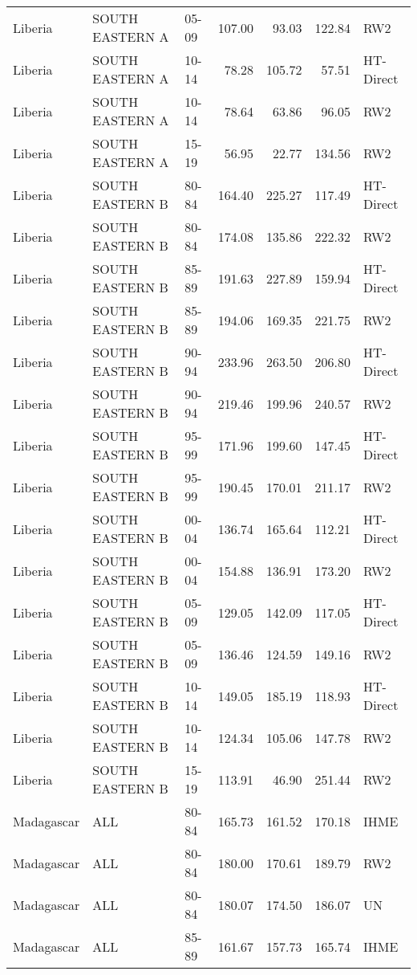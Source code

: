\begin{longtable}{lllrrrl}
  Liberia & SOUTH EASTERN A & 05-09 & 107.00 & 93.03 & 122.84 & RW2 \\ 
  Liberia & SOUTH EASTERN A & 10-14 & 78.28 & 105.72 & 57.51 & HT-Direct \\ 
  Liberia & SOUTH EASTERN A & 10-14 & 78.64 & 63.86 & 96.05 & RW2 \\ 
  Liberia & SOUTH EASTERN A & 15-19 & 56.95 & 22.77 & 134.56 & RW2 \\ 
  Liberia & SOUTH EASTERN B & 80-84 & 164.40 & 225.27 & 117.49 & HT-Direct \\ 
  Liberia & SOUTH EASTERN B & 80-84 & 174.08 & 135.86 & 222.32 & RW2 \\ 
  Liberia & SOUTH EASTERN B & 85-89 & 191.63 & 227.89 & 159.94 & HT-Direct \\ 
  Liberia & SOUTH EASTERN B & 85-89 & 194.06 & 169.35 & 221.75 & RW2 \\ 
  Liberia & SOUTH EASTERN B & 90-94 & 233.96 & 263.50 & 206.80 & HT-Direct \\ 
  Liberia & SOUTH EASTERN B & 90-94 & 219.46 & 199.96 & 240.57 & RW2 \\ 
  Liberia & SOUTH EASTERN B & 95-99 & 171.96 & 199.60 & 147.45 & HT-Direct \\ 
  Liberia & SOUTH EASTERN B & 95-99 & 190.45 & 170.01 & 211.17 & RW2 \\ 
  Liberia & SOUTH EASTERN B & 00-04 & 136.74 & 165.64 & 112.21 & HT-Direct \\ 
  Liberia & SOUTH EASTERN B & 00-04 & 154.88 & 136.91 & 173.20 & RW2 \\ 
  Liberia & SOUTH EASTERN B & 05-09 & 129.05 & 142.09 & 117.05 & HT-Direct \\ 
  Liberia & SOUTH EASTERN B & 05-09 & 136.46 & 124.59 & 149.16 & RW2 \\ 
  Liberia & SOUTH EASTERN B & 10-14 & 149.05 & 185.19 & 118.93 & HT-Direct \\ 
  Liberia & SOUTH EASTERN B & 10-14 & 124.34 & 105.06 & 147.78 & RW2 \\ 
  Liberia & SOUTH EASTERN B & 15-19 & 113.91 & 46.90 & 251.44 & RW2 \\ 
  Madagascar & ALL & 80-84 & 165.73 & 161.52 & 170.18 & IHME \\ 
  Madagascar & ALL & 80-84 & 180.00 & 170.61 & 189.79 & RW2 \\ 
  Madagascar & ALL & 80-84 & 180.07 & 174.50 & 186.07 & UN \\ 
  Madagascar & ALL & 85-89 & 161.67 & 157.73 & 165.74 & IHME \\ 

\end{longtable}
